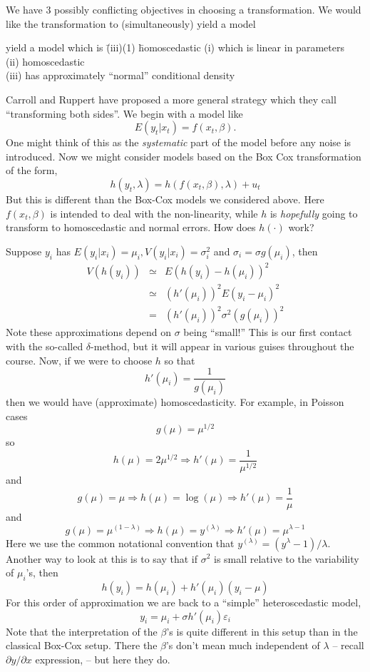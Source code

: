 \documentclass[11pt]{amsbook}
\begin{document}
We have 3 possibly conflicting objectives in choosing a transformation.  
We would like the transformation to (simultaneously) yield a model
\begin{tabbing}
yield a model which is \= (iii)(1) \= homoscedastic \kill
\> (i) \> which is linear in parameters\\
\>(ii)\> homoscedastic\\
\>(iii)\> has approximately ``normal'' conditional density
\end{tabbing}
Carroll and Ruppert have proposed a more general strategy which they call 
``transforming both sides''.  We begin with a model like
$$
E(y_t | x_t)  = f(x_t, \beta).
$$
One might think of this as the {\em systematic} part of the model before 
any noise is introduced.  Now we might consider models based on the Box
Cox transformation of the form,
$$
h(y_t, \lambda) = h(f(x_t, \beta), \lambda) + u_t
$$
But this is different than the Box-Cox models we considered above.
Here $f(x_t, \beta)$ is intended to deal with the non-linearity, 
while $h$ is {\em hopefully} going to transform to homoscedastic and 
normal errors.  How does $h(\cdot)$ work?

Suppose $y_i$ has $E(y_i|x_i) = \mu_i, V(y_i|x_i) = \sigma_i^2$ and
$\sigma_i = \sigma g(\mu_i)$, then
\begin{eqnarray*}
V(h(y_i)) &\simeq& E(h(y_i) - h(\mu_i))^2\\
&\simeq& (h'(\mu_i))^2 E(y_i-\mu_i)^2\\
&=& (h'(\mu_i))^2 \sigma^2(g(\mu_i))^2
\end{eqnarray*}
Note these approximations depend on $\sigma$ being ``small!''
This is our first contact with the so-called $\delta$-method, but
it will appear in various guises throughout the course.
Now, if we were to choose $h$ so that
$$
h'(\mu_i) = \frac{1}{g(\mu_i)}
$$
then we would have (approximate) homoscedasticity.  For example,
in Poisson cases
$$
g(\mu) = \mu^{1/2}
$$
so 
$$
h(\mu) = 2\mu^{1/2} \Rightarrow h'(\mu) = \frac{1}{\mu^{1/2}}
$$
and 
$$
g(\mu) = \mu \Rightarrow h(\mu) = \log (\mu) \Rightarrow h'(\mu) = \frac{1}{\mu}
$$
and
$$
g(\mu) = \mu^{(1-\lambda)} \Rightarrow h(\mu) = y^{(\lambda)} \Rightarrow h'(\mu) = \mu^{\lambda-1}
$$
Here we use the common notational convention that 
$y^{(\lambda)} = (y^\lambda -1)/\lambda$.
Another way to look at this is to say that if $\sigma^2$ is small relative to 
the variability of $\mu_i$'s, then
$$
h(y_i) = h(\mu_i) + h'(\mu_i)(y_i-\mu)
$$
For this order of approximation we are back to a ``simple'' 
heteroscedastic model,
$$
y_i = \mu_i + \sigma h'(\mu_i) \varepsilon_i
$$
Note that the interpretation of the $\beta$'s is quite different in this 
setup than in the classical Box-Cox setup.  There the $\beta$'s
don't mean much independent of $\lambda$ -- recall $\partial y / \partial x$
expression, -- but here they do.
\end{document}
